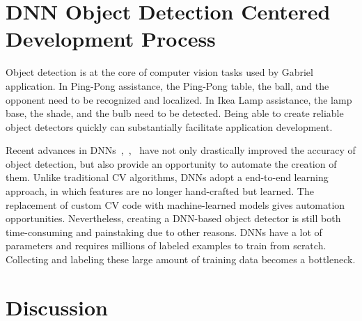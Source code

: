 


\section{DNN Object Detection Centered Development Process}

Object detection is at the core of computer vision tasks used by Gabriel
application. In Ping-Pong assistance, the Ping-Pong table, the ball, and the
opponent need to be recognized and localized. In Ikea Lamp assistance, the lamp
base, the shade, and the bulb need to be detected. Being able to create reliable
object detectors quickly can substantially facilitate application development.

Recent advances in DNNs~\cite{he2017mask},~\cite{Ren2015},~\cite{He2016} have not
only drastically improved the accuracy of object detection, but also provide an
opportunity to automate the creation of them. Unlike traditional CV algorithms,
DNNs adopt a end-to-end learning approach, in which features are no longer
hand-crafted but learned. The replacement of custom CV code with machine-learned
models gives automation opportunities. Nevertheless, creating a DNN-based object
detector is still both time-consuming and painstaking due to other reasons. DNNs
have a lot of parameters and requires millions of labeled examples to train from
scratch. Collecting and labeling these large amount of training data becomes a
bottleneck.



\section{Discussion}

